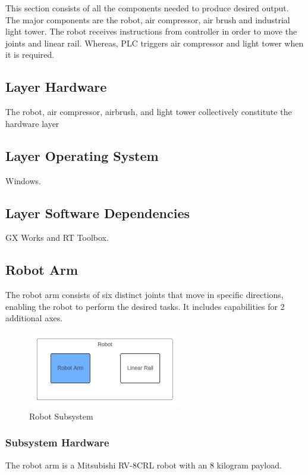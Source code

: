 This section consists of all the components needed to produce desired output. The major components are the robot, air compressor, air brush and industrial light tower. The robot receives instructions from controller in order to move the joints and linear rail. Whereas, PLC triggers air compressor and light tower when it is required.



\subsection{Layer Hardware}
The robot, air compressor, airbrush, and light tower collectively constitute the hardware layer

\subsection{Layer Operating System}
Windows.

\subsection{Layer Software Dependencies}
GX Works and RT Toolbox. 

\subsection{Robot Arm}
The robot arm consists of six distinct joints that move in specific directions, enabling the robot to perform the desired tasks. It includes capabilities for 2 additional axes.

\begin{figure}[h!]
	\centering
 	\includegraphics[width=0.60\textwidth]{images/Robot_Arm_Output.png}
 \caption{Robot Subsystem}
\end{figure}

\subsubsection{Subsystem Hardware}
The robot arm is a Mitsubishi RV-8CRL robot with an 8 kilogram payload.

